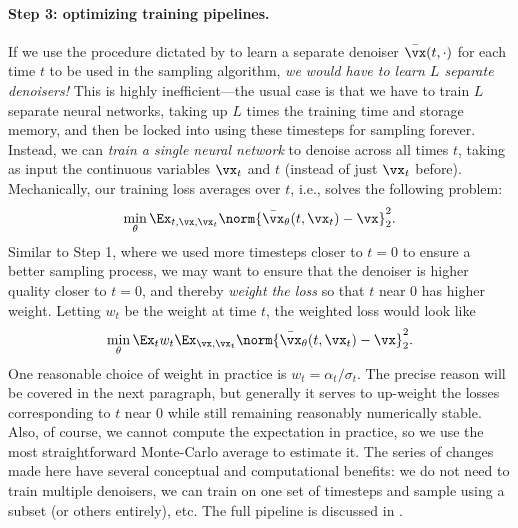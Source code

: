 \documentclass[../../book-main.tex]{subfiles}
\begin{document}
\paragraph{Step 3: optimizing training pipelines.} If we use the procedure dictated by  to learn a separate denoiser \(\bar{\vx}(t, \cdot)\) for each time \(t\) to be used in the sampling algorithm, \textit{we would have to learn \(L\) separate denoisers!} This is highly inefficient---the usual case is that we have to train \(L\) separate neural networks, taking up \(L\) times the training time and storage memory, and then be locked into using these timesteps for sampling forever. Instead, we can \textit{train a single neural network} to denoise across all times \(t\), taking as input the continuous variables \(\vx_{t}\) and \(t\) (instead of just \(\vx_{t}\) before). Mechanically, our training loss averages over \(t\), i.e., solves the following problem:
\begin{equation}\label{eq:training loss}
	\min_{\theta}\Ex_{t, \vx, \vx_{t}}\norm{\bar{\vx}_{\theta}(t, \vx_{t}) - \vx}_{2}^{2}.
\end{equation}
Similar to Step 1, where we used more timesteps closer to \(t = 0\) to ensure a better sampling process, we may want to ensure that the denoiser is higher quality closer to \(t = 0\), and thereby \textit{weight the loss} so that \(t\) near \(0\) has higher weight. Letting \(w_{t}\) be the weight at time \(t\), the weighted loss would look like
\begin{equation}\label{eq:parametric_denoising_loss}
	\min_{\theta}\Ex_{t}w_{t}\Ex_{\vx, \vx_{t}}\norm{\bar{\vx}_{\theta}(t, \vx_{t}) - \vx}_{2}^{2}.
\end{equation}
One reasonable choice of weight in practice is \(w_{t} = \alpha_{t}/\sigma_{t}\). The precise reason will be covered in the next paragraph, but generally it serves to up-weight the losses corresponding to \(t\) near \(0\) while still remaining reasonably numerically stable. Also, of course, we cannot compute the expectation in practice, so we use the most straightforward Monte-Carlo average to estimate it. The series of changes made here have several conceptual and computational benefits: we do not need to train multiple denoisers, we can train on one set of timesteps and sample using a subset (or others entirely), etc. The full pipeline is discussed in .
\end{document}
